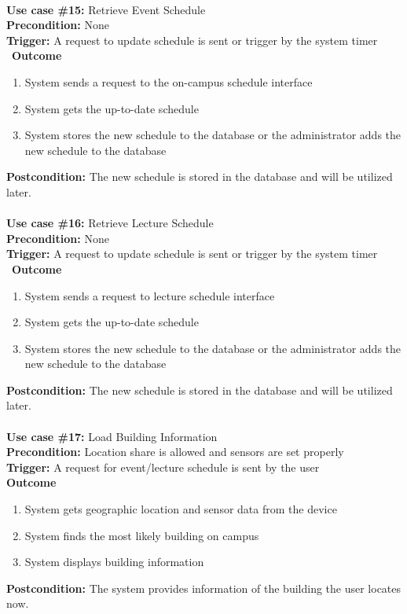 \documentclass[12pt]{article}
\begin{document}
\noindent\\
\textbf{Use case \#15:} Retrieve Event Schedule\\
\textbf{Precondition:} None\\
\textbf{Trigger:} A request to update schedule is sent or trigger by the system timer\\\
\textbf{Outcome}
\begin{enumerate}
	\item System sends a request to the on-campus schedule interface
    \item System gets the up-to-date schedule
    \item System stores the new schedule to the database or the administrator adds the new schedule to the database
\end{enumerate}
\textbf{Postcondition:} The new schedule is stored in the database and will be utilized later.\\


\noindent\\
\textbf{Use case \#16:} Retrieve Lecture Schedule\\
\textbf{Precondition:} None\\
\textbf{Trigger:} A request to update schedule is sent or trigger by the system timer\\\
\textbf{Outcome}
\begin{enumerate}
	\item System sends a request to lecture schedule interface
    \item System gets the up-to-date schedule
    \item System stores the new schedule to the database or the administrator adds the new schedule to the database
\end{enumerate}
\textbf{Postcondition:} The new schedule is stored in the database and will be utilized later.\\


\noindent\\
\textbf{Use case \#17:} Load Building Information\\
\textbf{Precondition:} Location share is allowed and sensors are set properly\\
\textbf{Trigger:} A request for event/lecture schedule is sent by the user\\
\textbf{Outcome}
\begin{enumerate}
	\item System gets geographic location and sensor data from the device
    \item System finds the most likely building on campus
    \item System displays building information
\end{enumerate}
\textbf{Postcondition:} The system provides information of the building the user locates now.\\
\end{document}
